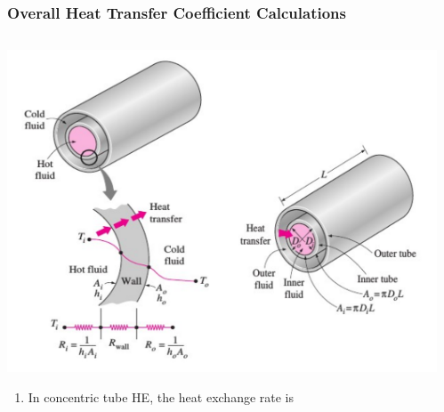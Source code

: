 \documentclass[10pt,compress]{beamer}
\newcommand{\blue}{\textcolor{blue}}
\begin{document}
\begin{frame}
  \frametitle{Overall Heat Transfer Coefficient Calculations}
    \begin{columns}
       \begin{column}[l]{0.5\linewidth}
         \includegraphics[width=1.1\columnwidth,clip]{./Pics/HeatExchangers_Flow}
         \begin{enumerate}\scriptsize
            \item<1-> In concentric tube HE, the heat exchange rate is
         \end{enumerate}
       \end{column}
       \begin{column}[l]{0.5\linewidth}
         \begin{enumerate}\setcounter{enumi}{1}\scriptsize

\end{enumerate}
\end{column}
\end{columns}
\end{frame}
\end{document}
